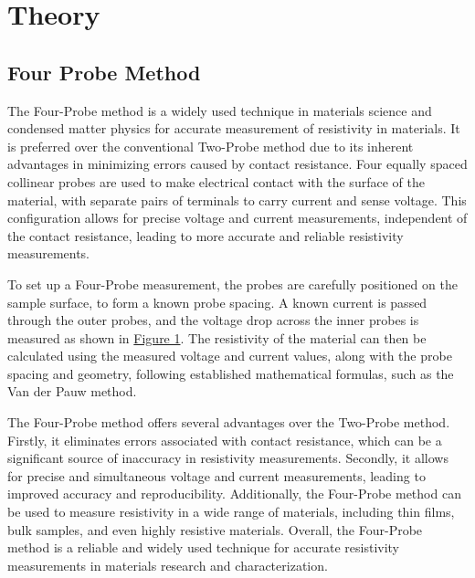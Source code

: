 \section{Theory}
	\subsection{Four Probe Method}
		The Four-Probe method is a widely used technique in materials science and condensed matter physics for accurate measurement of resistivity in materials. It is preferred over the conventional Two-Probe method due to its inherent advantages in minimizing errors caused by contact resistance. Four equally spaced collinear probes are used to make electrical contact with the surface of the material, with separate pairs of terminals to carry current and sense voltage. This configuration allows for precise voltage and current measurements, independent of the contact resistance, leading to more accurate and reliable resistivity measurements.

		To set up a Four-Probe measurement, the probes are carefully positioned on the sample surface, to form a known probe spacing. A known current is passed through the outer probes, and the voltage drop across the inner probes is measured as shown in \hyperref[th:1]{Figure 1}. The resistivity of the material can then be calculated using the measured voltage and current values, along with the probe spacing and geometry, following established mathematical formulas, such as the Van der Pauw method.
		
		The Four-Probe method offers several advantages over the Two-Probe method. Firstly, it eliminates errors associated with contact resistance, which can be a significant source of inaccuracy in resistivity measurements. Secondly, it allows for precise and simultaneous voltage and current measurements, leading to improved accuracy and reproducibility. Additionally, the Four-Probe method can be used to measure resistivity in a wide range of materials, including thin films, bulk samples, and even highly resistive materials. Overall, the Four-Probe method is a reliable and widely used technique for accurate resistivity measurements in materials research and characterization.
		
